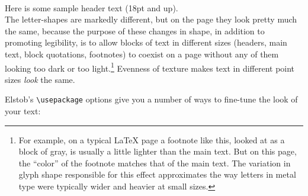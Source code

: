 \documentclass[12pt]{article}
\begin{document}
\\[0.2ex]
{\large\sampleheader Here is some sample header text (18pt and up).}\\[0.5ex]

\noindent The letter-shapes are markedly different, but on the page they look
pretty much the same, because the purpose of these changes in
shape, in addition to promoting legibility,
is to allow blocks of text in different sizes (headers, main text,
block quotations, footnotes) to coexist on a page without any of them looking too
dark or too light.\footnote{%
For example, on a typical {\LaTeX} page a footnote like this, looked at as a block
of gray, is usually a little lighter than the main text. But on this page, the
“color” of the footnote matches that of the main text. The variation in glyph
shape responsible for this effect approximates the way letters in metal type were
typically wider and heavier at small sizes.} Evenness of texture makes text in
different point sizes \emph{look} the same.

Elstob's {\color{BrickRed}\verb|\usepackage|} options give you a number of ways to
fine-tune the look of your text:
\end{document}
